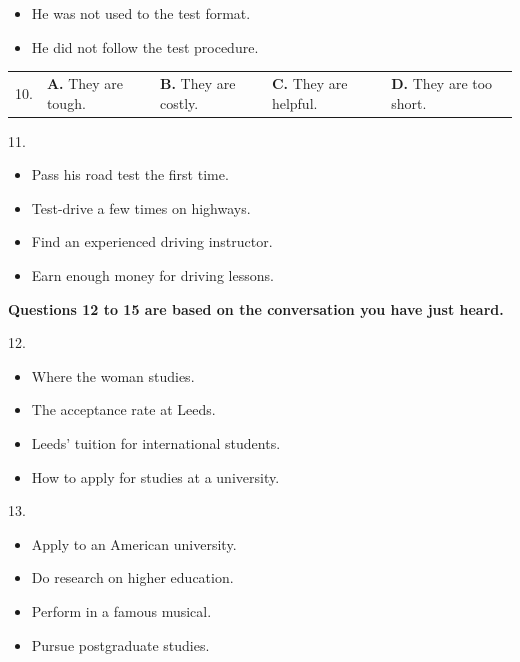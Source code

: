 \documentclass[UTF8,11pt]{ctexart}
\begin{document}
\begin{itemize}[leftmargin=2em,itemsep=.2em,topsep=.4em]\item[C.] He was not used to the test format.
\item[D.] He did not follow the test procedure.
\end{itemize}

\noindent\begin{tabularx}{\linewidth}{@{}lXXXX@{}}10. & \textbf{A.} They are tough. & \textbf{B.} They are costly. & \textbf{C.} They are helpful. & \textbf{D.} They are too short.\\\end{tabularx}\par

11.


\begin{itemize}[leftmargin=2em,itemsep=.2em,topsep=.4em]\item[A.] Pass his road test the first time.
\item[B.] Test-drive a few times on highways.
\item[C.] Find an experienced driving instructor.
\item[D.] Earn enough money for driving lessons.
\end{itemize}

\textbf{Questions 12 to 15 are based on the conversation you have just heard.}


12.


\begin{itemize}[leftmargin=2em,itemsep=.2em,topsep=.4em]\item[A.] Where the woman studies.
\item[B.] The acceptance rate at Leeds.
\item[C.] Leeds’ tuition for international students.
\item[D.] How to apply for studies at a university.
\end{itemize}

13.


\begin{itemize}[leftmargin=2em,itemsep=.2em,topsep=.4em]\item[A.] Apply to an American university.
\item[B.] Do research on higher education.
\item[C.] Perform in a famous musical.
\item[D.] Pursue postgraduate studies.
\end{itemize}
\end{document}
